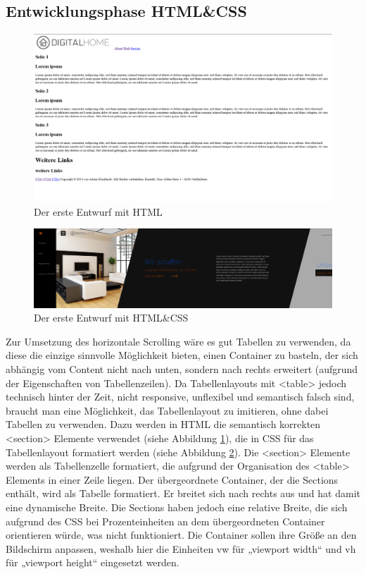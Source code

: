 	\subsection{Entwicklungsphase HTML\&CSS}
\begin{figure} [tp]
\includegraphics[width=\textwidth]{./img/inno_comp2.png}
\caption{Der erste Entwurf mit HTML}
\label{inno_Comp2}
\end{figure}
\begin{figure} [tp]
\includegraphics[width=\textwidth]{./img/inno_comp3.png}
\caption{Der erste Entwurf mit HTML\&CSS}
\label{inno_Comp3}
\end{figure}

Zur Umsetzung des horizontale Scrolling wäre es gut Tabellen zu verwenden, da diese die einzige sinnvolle Möglichkeit bieten, einen Container zu basteln, der sich abhängig vom Content nicht nach unten, sondern nach rechts erweitert (aufgrund der Eigenschaften von Tabellenzeilen). Da Tabellenlayouts mit <table> jedoch technisch hinter der Zeit, nicht responsive, unflexibel und semantisch falsch sind, braucht man eine Möglichkeit, das Tabellenlayout zu imitieren, ohne dabei Tabellen zu verwenden. Dazu werden in HTML die semantisch korrekten <section> Elemente verwendet (siehe Abbildung \ref{inno_Comp2}), die in CSS für das Tabellenlayout formatiert werden (siehe Abbildung \ref{inno_Comp3}). Die <section> Elemente werden als Tabellenzelle formatiert, die aufgrund der Organisation des <table> Elements in einer Zeile liegen. Der übergeordnete Container, der die Sections enthält, wird als Tabelle formatiert. Er breitet sich nach rechts aus und hat damit eine dynamische Breite. Die Sections haben jedoch eine relative Breite, die sich aufgrund des CSS bei Prozenteinheiten an dem übergeordneten Container orientieren würde, was nicht funktioniert. Die Container sollen ihre Größe an den Bildschirm anpassen, weshalb hier die Einheiten vw für „viewport width“ und vh für „viewport height“ eingesetzt werden.


